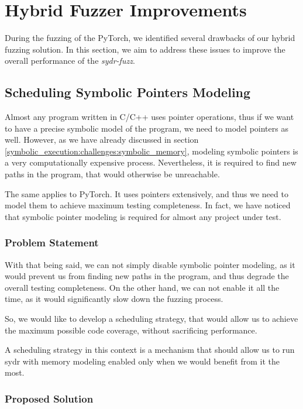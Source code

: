 \section{Hybrid Fuzzer Improvements}

During the fuzzing of the PyTorch, we identified several drawbacks of our hybrid fuzzing solution. In this section, we aim to address these issues to improve the overall performance of the \textit{sydr-fuzz}.

\subsection{Scheduling Symbolic Pointers Modeling}

Almost any program written in C/C++ uses pointer operations, thus if we want to have a precise symbolic model of the program, we need to model pointers as well. However, as we have already discussed in section \ref{symbolic_execution:challenges:symbolic_memory}, modeling symbolic pointers is a very computationally expensive process. Nevertheless, it is required to find new paths in the program, that would otherwise be unreachable.

The same applies to PyTorch. It uses pointers extensively, and thus we need to model them to achieve maximum testing completeness. In fact, we have noticed that symbolic pointer modeling is required for almost any project under test.

\subsubsection{Problem Statement}

With that being said, we can not simply disable symbolic pointer modeling, as it would prevent us from finding new paths in the program, and thus degrade the overall testing completeness. On the other hand, we can not enable it all the time, as it would significantly slow down the fuzzing process.

So, we would like to develop a scheduling strategy, that would allow us to achieve the maximum possible code coverage, without sacrificing performance.

A scheduling strategy in this context is a mechanism that should allow us to run sydr with memory modeling enabled only when we would benefit from it the most.

\subsubsection{Proposed Solution}

